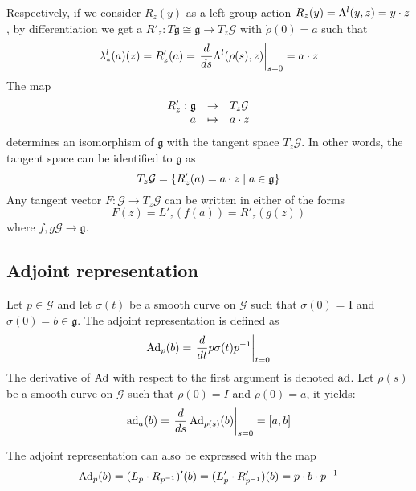 Respectively, if we consider $R_z(y)$ as a left group action $ R_z(y) = \Lambda^l( y, z) =y \cdot z $, by differentiation we get a $R'_z : T \mathfrak g \cong  \mathfrak g \rightarrow T_z\mathcal G$ with $\dot\rho (0)=a$ such that
\begin{equation}
  \label{eq:150}
  \lambda^l_{*}(a)(z) = R'_z(a) = \left.\frac{d}{ds}{ \Lambda^l (\rho(s),z)}\right|_{s=0} = a \cdot z
\end{equation}
The map
\begin{equation}
  \label{eq:152}
  \begin{array}{rcl}
  R'_z  : \mathfrak g &\rightarrow& T_z\mathcal G  \\
         a &\mapsto&  a \cdot z
  \end{array}
\end{equation}
determines an isomorphism of $\mathfrak g$ with the tangent space  $T_z\mathcal G$. In other words, the  tangent space can be identified to $\mathfrak g$ as
\begin{equation}
  \label{eq:153}
  T_z\mathcal G =\{R'_z(a) = a \cdot z \mid a \in \mathfrak g  \}
\end{equation}
Any tangent vector $F : \mathcal G \rightarrow T_z\mathcal G$ can be written in either of the forms
\begin{equation}
  \label{eq:155}
  F(z) = L'_z(f(a)) = R'_z(g(z))
\end{equation}
where $f,g \mathcal G \rightarrow \mathfrak g$. 
\subsection{Adjoint representation}
\begin{definition}
Let $p \in \mathcal G$ and let $\sigma (t)$ be a smooth curve on $\mathcal G$ such that $\sigma (0)$ = I and $\dot \sigma(0) = b \in \mathfrak g$. The adjoint representation is defined as
\begin{equation}
\operatorname{Ad}_p(b) =\left. \frac{d}{dt} p\sigma(t)p^{-1}\right|_{t=0}\label{eq:40}
\end{equation}
The derivative of $\operatorname{Ad}$ with respect to the first argument is denoted $\operatorname{ad}$. Let $\rho(s)$ be a smooth curve on $\mathcal G$ such that $\rho(0) = I$  and $\dot \rho(0) = a$, it  yields:
\begin{equation}
  \label{eq:41}
    \operatorname{ad}_a(b) = \left.\frac{d}{ds} \operatorname{Ad}_{\rho(s)}(b)\right|_{s=0}  = [a, b]
\end{equation}
\end{definition}
The adjoint representation can also be expressed with the map
\begin{equation}
  \label{eq:154}
  \operatorname{Ad}_p(b)  = (L_p \cdot R_{p^{-1}})' (b) = (L'_p \cdot R'_{p^{-1}}) (b) = p \cdot b \cdot p^{-1}  
\end{equation}

